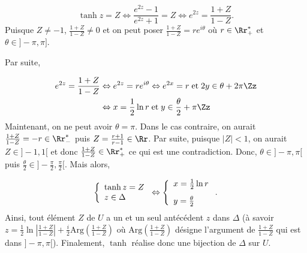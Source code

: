 {\begin{enumerate}
{$$\tanh z=Z\Leftrightarrow\frac{e^{2z}-1}{e^{2z}+1}=Z\Leftrightarrow e^{2z}=\frac{1+Z}{1-Z}.$$
Puisque $Z\neq-1$, $\frac{1+Z}{1-Z}\neq0$ et on peut poser $\frac{1+Z}{1-Z}=re^{i\theta}$ où $r\in\Rr_+^*$ et
$\theta\in]-\pi,\pi]$.

Par suite,

\begin{align*}
e^{2z}=\frac{1+Z}{1-Z}&\Leftrightarrow e^{2z}=re^{i\theta}\Leftrightarrow e^{2x}=r\;\mbox{et}\;2y\in\theta+2\pi\Zz\\
 &\Leftrightarrow x=\frac{1}{2}\ln r\;\mbox{et}\;y\in\frac{\theta}{2}+\pi\Zz
\end{align*}
Maintenant, on ne peut avoir $\theta=\pi$. Dans le cas contraire, on aurait $\frac{1+Z}{1-Z}=-r\in\Rr_-^*$ puis
$Z=\frac{r+1}{r-1}\in\Rr$. Par suite, puisque $|Z|<1$, on aurait $Z\in]-1,1[$ et donc $\frac{1+Z}{1-Z}\in\Rr_+^*$ ce
qui est une contradiction. Donc, $\theta\in]-\pi,\pi[$ puis $\frac{\theta}{2}\in]-\frac{\pi}{2},\frac{\pi}{2}[$.
Mais alors,

$$\left\{
\begin{array}{l}
\tanh z=Z\\
z\in\Delta
\end{array}
\right.
\Leftrightarrow\left\{
\begin{array}{l}
x=\frac{1}{2}\ln r\\
y=\frac{\theta}{2}\rule{0mm}{6mm}
\end{array}
\right..$$
Ainsi, tout élément $Z$ de $U$ a un et un seul antécédent $z$ dans $\Delta$ (à savoir
$z=\frac{1}{2}\ln\left|\frac{1+Z}{1-Z}\right|+\frac{i}{2}\mbox{Arg}\left(\frac{1+Z}{1-Z}\right)$ où 
$\mbox{Arg}\left(\frac{1+Z}{1-Z}\right)$ désigne l'argument de $\frac{1+Z}{1-Z}$ qui est dans $]-\pi,\pi[$).
Finalement, $\tanh$ réalise donc une bijection de $\Delta$ sur $U$.}
\end{enumerate}
}
